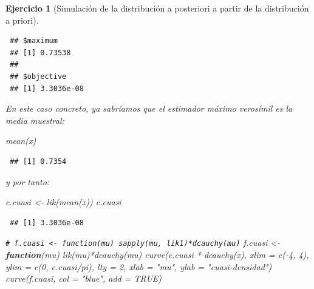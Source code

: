 \documentclass[
  10pt,
]{book}
\newenvironment{Shaded}{\begin{snugshade}}{\end{snugshade}}
\newcommand{\AttributeTok}[1]{\textcolor[rgb]{0.77,0.63,0.00}{#1}}
\newcommand{\CommentTok}[1]{\textcolor[rgb]{0.56,0.35,0.01}{\textit{#1}}}
\newcommand{\ConstantTok}[1]{\textcolor[rgb]{0.00,0.00,0.00}{#1}}
\newcommand{\ControlFlowTok}[1]{\textcolor[rgb]{0.13,0.29,0.53}{\textbf{#1}}}
\newcommand{\DecValTok}[1]{\textcolor[rgb]{0.00,0.00,0.81}{#1}}
\newcommand{\FunctionTok}[1]{\textcolor[rgb]{0.00,0.00,0.00}{#1}}
\newcommand{\NormalTok}[1]{#1}
\newcommand{\OtherTok}[1]{\textcolor[rgb]{0.56,0.35,0.01}{#1}}
\newcommand{\SpecialCharTok}[1]{\textcolor[rgb]{0.00,0.00,0.00}{#1}}
\newcommand{\StringTok}[1]{\textcolor[rgb]{0.31,0.60,0.02}{#1}}
\theoremstyle{break}
\newtheorem{exercise}{Ejercicio}[chapter]
\theoremstyle{nonumberplain}
\renewcommand{\CommentTok}[1]{\textcolor[rgb]{0.41,0.41,0.41}{\texttt{#1}}}
\begin{document}
\begin{exercise}[Simulación de la distribución a posteriori a partir de la distribución a priori]
\begin{enumerate}
\begin{verbatim}
 ## $maximum
 ## [1] 0.73538
 ## 
 ## $objective
 ## [1] 3.3036e-08
\end{verbatim}

\begin{Shaded}
\end{Shaded}

  En este caso concreto, ya sabríamos que el estimador máximo verosímil es la media muestral:

\begin{Shaded}
\begin{Highlighting}[]
\FunctionTok{mean}\NormalTok{(x)}
\end{Highlighting}
\end{Shaded}

\begin{verbatim}
 ## [1] 0.7354
\end{verbatim}

  y por tanto:

\begin{Shaded}
\begin{Highlighting}[]
\NormalTok{c.cuasi }\OtherTok{\textless{}{-}} \FunctionTok{lik}\NormalTok{(}\FunctionTok{mean}\NormalTok{(x))}
\NormalTok{c.cuasi   }
\end{Highlighting}
\end{Shaded}

\begin{verbatim}
 ## [1] 3.3036e-08
\end{verbatim}

\begin{Shaded}
\begin{Highlighting}[]
\CommentTok{\# f.cuasi \textless{}{-} function(mu) sapply(mu, lik1)*dcauchy(mu)}
\NormalTok{f.cuasi }\OtherTok{\textless{}{-}} \ControlFlowTok{function}\NormalTok{(mu) }\FunctionTok{lik}\NormalTok{(mu)}\SpecialCharTok{*}\FunctionTok{dcauchy}\NormalTok{(mu)    }
\FunctionTok{curve}\NormalTok{(c.cuasi }\SpecialCharTok{*} \FunctionTok{dcauchy}\NormalTok{(x), }\AttributeTok{xlim =} \FunctionTok{c}\NormalTok{(}\SpecialCharTok{{-}}\DecValTok{4}\NormalTok{, }\DecValTok{4}\NormalTok{), }\AttributeTok{ylim =} \FunctionTok{c}\NormalTok{(}\DecValTok{0}\NormalTok{, c.cuasi}\SpecialCharTok{/}\NormalTok{pi), }\AttributeTok{lty =} \DecValTok{2}\NormalTok{,}
      \AttributeTok{xlab =} \StringTok{"mu"}\NormalTok{, }\AttributeTok{ylab =} \StringTok{"cuasi{-}densidad"}\NormalTok{)}
\FunctionTok{curve}\NormalTok{(f.cuasi, }\AttributeTok{col =} \StringTok{"blue"}\NormalTok{, }\AttributeTok{add =} \ConstantTok{TRUE}\NormalTok{)}
\end{Highlighting}
\end{Shaded}


\end{enumerate}
\end{exercise}
\end{document}
